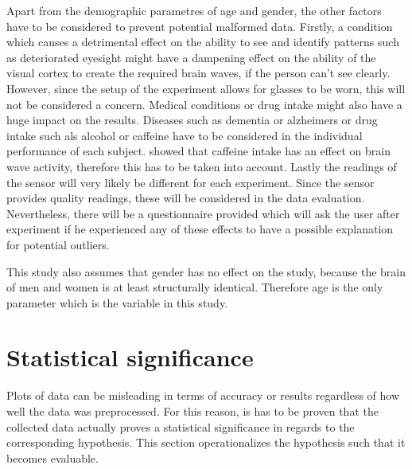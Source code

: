             Apart from the demographic parametres of age and gender, the other factors have to be considered to prevent potential malformed data. Firstly, a condition which causes a detrimental effect on the ability to see and identify patterns such as deteriorated eyesight might have a dampening effect on the ability of the visual cortex to create the required brain waves, if the person can't see clearly. However, since the setup of the experiment allows for glasses to be worn, this will not be considered a concern. 
            Medical conditions or drug intake might also have a huge impact on the results. Diseases such as dementia or alzheimers or drug intake such als alcohol or caffeine have to be considered in the individual performance of each subject. \cite{Kenemans.1995} showed that caffeine intake has an effect on brain wave activity, therefore this has to be taken into account.
            Lastly the readings of the sensor will very likely be different for each experiment. Since the sensor provides quality readings, these will be considered in the data evaluation. Nevertheless, there will be a questionnaire provided which will ask the user after experiment if he experienced any of these effects to have a possible explanation for potential outliers.

            \medskip

            This study also assumes that gender has no effect on the study, because the brain of men and women is at least structurally identical. Therefore age is the only parameter which is the variable in this study.

        \section{Statistical significance}\label{doe}

            Plots of data can be misleading in terms of accuracy or results regardless of how well the data was preprocessed. For this reason, is has to be proven that the collected data actually proves a statistical significance in regards to the corresponding hypothesis. This section operationalizes the hypothesis such that it becomes evaluable.

            \medskip

